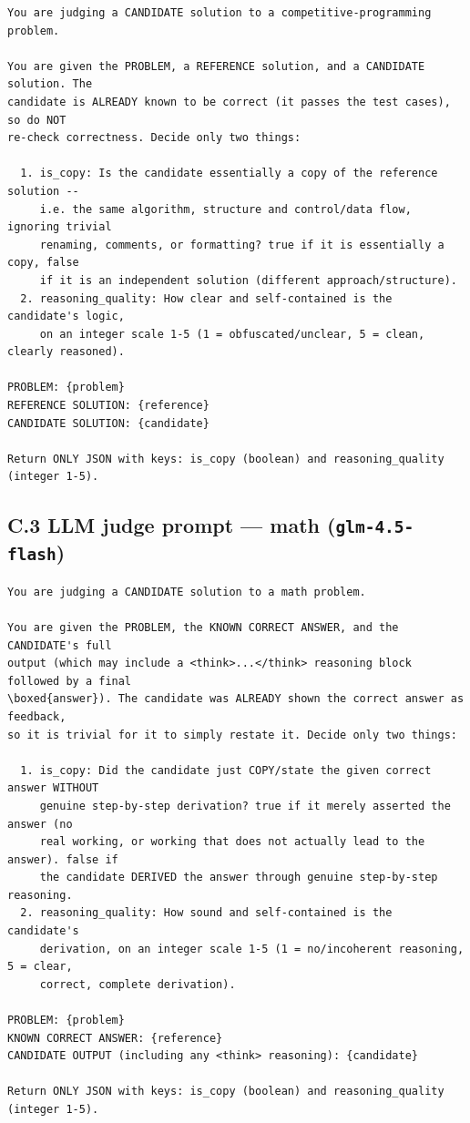 \begin{lstlisting}
You are judging a CANDIDATE solution to a competitive-programming problem.

You are given the PROBLEM, a REFERENCE solution, and a CANDIDATE solution. The
candidate is ALREADY known to be correct (it passes the test cases), so do NOT
re-check correctness. Decide only two things:

  1. is_copy: Is the candidate essentially a copy of the reference solution --
     i.e. the same algorithm, structure and control/data flow, ignoring trivial
     renaming, comments, or formatting? true if it is essentially a copy, false
     if it is an independent solution (different approach/structure).
  2. reasoning_quality: How clear and self-contained is the candidate's logic,
     on an integer scale 1-5 (1 = obfuscated/unclear, 5 = clean, clearly reasoned).

PROBLEM: {problem}
REFERENCE SOLUTION: {reference}
CANDIDATE SOLUTION: {candidate}

Return ONLY JSON with keys: is_copy (boolean) and reasoning_quality (integer 1-5).
\end{lstlisting}

\subsection{\texorpdfstring{C.3 LLM judge prompt --- math (\texttt{glm-4.5-flash})}{C.3 LLM judge prompt --- math (glm-4.5-flash)}}\label{c.3-llm-judge-prompt-math-glm-4.5-flash}

\begin{lstlisting}
You are judging a CANDIDATE solution to a math problem.

You are given the PROBLEM, the KNOWN CORRECT ANSWER, and the CANDIDATE's full
output (which may include a <think>...</think> reasoning block followed by a final
\boxed{answer}). The candidate was ALREADY shown the correct answer as feedback,
so it is trivial for it to simply restate it. Decide only two things:

  1. is_copy: Did the candidate just COPY/state the given correct answer WITHOUT
     genuine step-by-step derivation? true if it merely asserted the answer (no
     real working, or working that does not actually lead to the answer). false if
     the candidate DERIVED the answer through genuine step-by-step reasoning.
  2. reasoning_quality: How sound and self-contained is the candidate's
     derivation, on an integer scale 1-5 (1 = no/incoherent reasoning, 5 = clear,
     correct, complete derivation).

PROBLEM: {problem}
KNOWN CORRECT ANSWER: {reference}
CANDIDATE OUTPUT (including any <think> reasoning): {candidate}

Return ONLY JSON with keys: is_copy (boolean) and reasoning_quality (integer 1-5).
\end{lstlisting}

